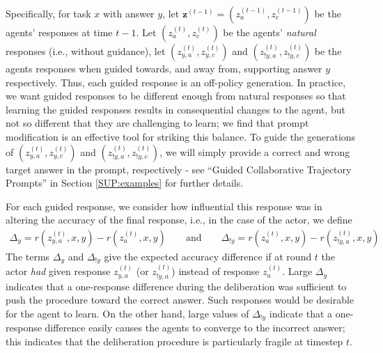 Specifically, for task $x$ with answer $y$, let $\mathbf{z}^{(t-1)} = (z_a^{(t-1)}, z_c^{(t-1)})$ be the agents' responses at time $t-1$. 
Let $(z_a^{(t)}, z_c^{(t)})$ be the agents' \emph{natural} responses (i.e., without guidance), let $(z_{y,a}^{(t)}, z_{y,c}^{(t)})$ and $(z_{!y,a}^{(t)}, z_{!y,c}^{(t)})$ be the agents responses when guided towards, and away from, supporting answer $y$ respectively.
Thus, each guided response is an off-policy generation.
In practice, we want guided responses to be different enough from natural responses so that learning the guided responses results in consequential changes to the agent, but not so different that they are challenging to learn;  we find that prompt modification is an effective tool for striking this balance. 
To guide the generations of $(z_{y,a}^{(t)}, z_{y,c}^{(t)})$ and $(z_{!y,a}^{(t)}, z_{!y,c}^{(t)})$, we will simply provide a correct and wrong target answer in the prompt, respectively -  see ``Guided Collaborative Trajectory Prompts'' in  Section \ref{SUP:examples} for further details. 


For each guided response, we consider how influential this response was in altering the accuracy of the final response, i.e., in the case of the actor, we define
\begin{align*}
    \Delta_{y} = r(z_{y,a}^{(t)}, x, y) - r(z_{a}^{(t)}, x, y)         \qquad \text{and} \qquad \Delta_{!y} = r(z_{a}^{(t)}, x, y) - r(z_{!y,a}^{(t)}, x, y)
\end{align*}
The terms $\Delta_{y}$ and $\Delta_{!y}$ give the expected accuracy difference if at round $t$ the actor \emph{had} given response $z_{y,a}^{(t)}$ (or $z_{!y,a}^{(t)}$) instead of response $z_a^{(t)}$.
Large $\Delta_{y}$ indicates that a one-response difference during the deliberation was sufficient to push the procedure toward the correct answer. 
Such responses would be desirable for the agent to learn.
On the other hand, large values of $\Delta_{!y}$ indicate that a one-response difference easily causes the agents to converge to the incorrect answer; this indicates that the deliberation procedure is particularly fragile at timestep $t$.

